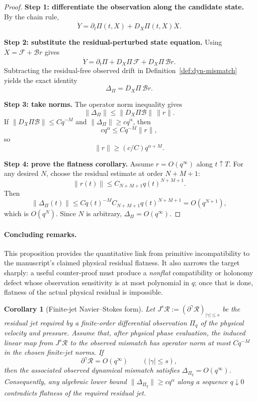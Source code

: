 \documentclass[12pt]{article}
\newtheorem{corollary}[theorem]{Corollary}
\newcommand{\Rres}{\mathcal R}
\begin{document}
\begin{proof}
\textbf{Step 1: differentiate the observation along the candidate state.}
By the chain rule,
\[
\dot Y
=\partial_t\Pi(t,X)+D_X\Pi(t,X)\dot X.
\]

\textbf{Step 2: substitute the residual-perturbed state equation.}
Using $\dot X=\mathcal F+\mathcal B r$ gives
\[
\dot Y
=\partial_t\Pi
+D_X\Pi\,\mathcal F
+D_X\Pi\,\mathcal B r.
\]
Subtracting the residual-free observed drift in Definition~\ref{def:dyn-mismatch} yields the exact identity
\[
\Delta_\Pi=D_X\Pi\,\mathcal B r.
\]

\textbf{Step 3: take norms.}
The operator norm inequality gives
\[
\|\Delta_\Pi\|
\le \|D_X\Pi\mathcal B\|\,\|r\|.
\]
If $\|D_X\Pi\mathcal B\|\le Cq^{-M}$ and $\|\Delta_\Pi\|\ge cq^\alpha$, then
\[
cq^\alpha
\le Cq^{-M}\|r\|,
\]
so
\[
\|r\|\ge(c/C)q^{\alpha+M}.
\]

\textbf{Step 4: prove the flatness corollary.}
Assume $r=O(q^\infty)$ along $t\uparrow T$. For any desired $N$, choose the residual estimate at order $N+M+1$:
\[
\|r(t)\|\le C_{N+M+1}q(t)^{N+M+1}.
\]
Then
\[
\|\Delta_\Pi(t)\|
\le Cq(t)^{-M}C_{N+M+1}q(t)^{N+M+1}
=O(q^{N+1}),
\]
which is $O(q^N)$. Since $N$ is arbitrary, $\Delta_\Pi=O(q^\infty)$.
\end{proof}

\paragraph{Concluding remarks.}
This proposition provides the quantitative link from primitive incompatibility to the manuscript's claimed physical residual flatness. It also narrows the target sharply: a useful counter-proof must produce a \emph{nonflat} compatibility or holonomy defect whose observation sensitivity is at most polynomial in $q$; once that is done, flatness of the actual physical residual is impossible.

\begin{corollary}[Finite-jet Navier--Stokes form]\label{cor:jetleakage}
Let $J^s\Rres:=(\partial^\gamma\Rres)_{|\gamma|\le s}$ be the residual jet required by a finite-order differential observation $\Pi_q$ of the physical velocity and pressure. Assume that, after physical phase evaluation, the induced linear map from $J^s\Rres$ to the observed mismatch has operator norm at most $Cq^{-M}$ in the chosen finite-jet norms. If
\[
\partial^\gamma\Rres=O(q^\infty)
\qquad(|\gamma|\le s),
\]
then the associated observed dynamical mismatch satisfies $\Delta_{\Pi_q}=O(q^\infty)$. Consequently, any algebraic lower bound $\|\Delta_{\Pi_q}\|\ge cq^\alpha$ along a sequence $q\downarrow0$ contradicts flatness of the required residual jet.
\end{corollary}
\end{document}
